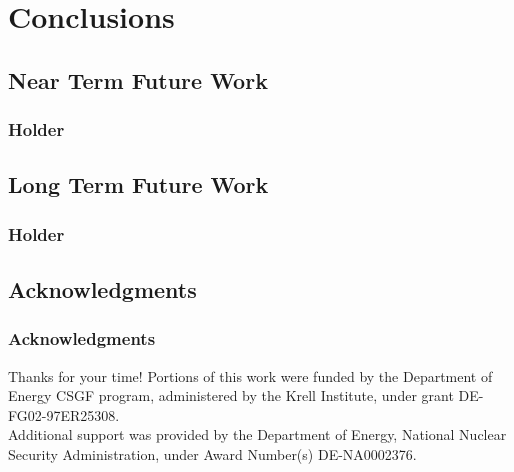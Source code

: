 \documentclass{beamer}
\begin{document}
\section{Conclusions}
\subsection{Near Term Future Work}
\begin{frame}
\frametitle{Holder}
\end{frame}

\subsection{Long Term Future Work}
\begin{frame}
\frametitle{Holder}
\end{frame}

\subsection{Acknowledgments}
\begin{frame}
\frametitle{Acknowledgments}
Thanks for your time!
\vspace{0.3in}
Portions of this work were funded by the Department of Energy CSGF program, administered by the Krell Institute, under grant DE-FG02-97ER25308.
\\
\vspace{0.3in}
Additional support was provided by the Department of Energy, National Nuclear Security Administration, under Award Number(s) DE-NA0002376.

\end{frame}

\end{document}
